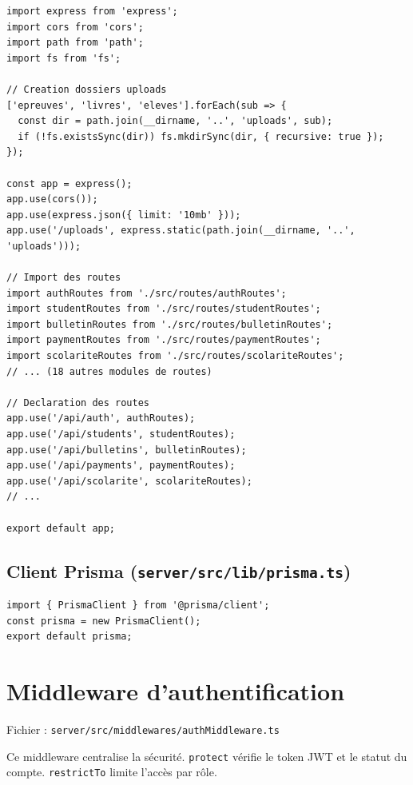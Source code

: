 \documentclass[12pt,a4paper]{article}
\begin{document}
\begin{lstlisting}[style=code]
import express from 'express';
import cors from 'cors';
import path from 'path';
import fs from 'fs';

// Creation dossiers uploads
['epreuves', 'livres', 'eleves'].forEach(sub => {
  const dir = path.join(__dirname, '..', 'uploads', sub);
  if (!fs.existsSync(dir)) fs.mkdirSync(dir, { recursive: true });
});

const app = express();
app.use(cors());
app.use(express.json({ limit: '10mb' }));
app.use('/uploads', express.static(path.join(__dirname, '..', 'uploads')));

// Import des routes
import authRoutes from './src/routes/authRoutes';
import studentRoutes from './src/routes/studentRoutes';
import bulletinRoutes from './src/routes/bulletinRoutes';
import paymentRoutes from './src/routes/paymentRoutes';
import scolariteRoutes from './src/routes/scolariteRoutes';
// ... (18 autres modules de routes)

// Declaration des routes
app.use('/api/auth', authRoutes);
app.use('/api/students', studentRoutes);
app.use('/api/bulletins', bulletinRoutes);
app.use('/api/payments', paymentRoutes);
app.use('/api/scolarite', scolariteRoutes);
// ...

export default app;
\end{lstlisting}

\subsection{Client Prisma (\texttt{server/src/lib/prisma.ts})}

\begin{lstlisting}[style=code]
import { PrismaClient } from '@prisma/client';
const prisma = new PrismaClient();
export default prisma;
\end{lstlisting}

\newpage

\section{Middleware d'authentification}

Fichier : \texttt{server/src/middlewares/authMiddleware.ts}

Ce middleware centralise la sécurité. \texttt{protect} vérifie le token JWT et le statut du compte. \texttt{restrictTo} limite l'accès par rôle.
\end{document}
